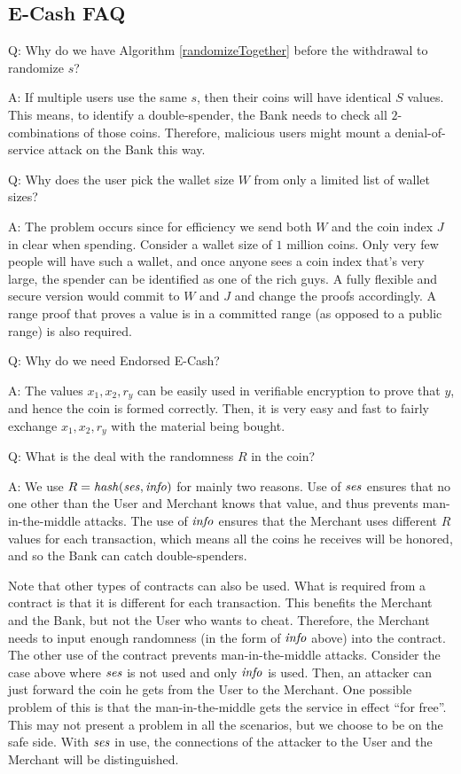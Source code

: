 \subsection{E-Cash FAQ}
Q: Why do we have Algorithm \ref{randomizeTogether} before the withdrawal to randomize $s$?

\noindent A: If multiple users use the same $s$, then their coins will have identical $S$ values. This means, to identify a double-spender, the Bank needs to check all $2$-combinations of those coins. Therefore, malicious users might mount a denial-of-service attack on the Bank this way.


Q: Why does the user pick the wallet size $W$ from only a limited list of wallet sizes?

\noindent A: The problem occurs since for efficiency we send both $W$ and the coin index $J$ in clear when spending. Consider a wallet size of $1$ million coins. Only very few people will have such a wallet, and once anyone sees a coin index that's very large, the spender can be identified as one of the rich guys. A fully flexible and secure version would commit to $W$ and $J$ and change the proofs accordingly. A range proof that proves a value is in a committed range (as opposed to a public range) is also required.


Q: Why do we need Endorsed E-Cash?

\noindent A: The values $x_1,x_2,r_y$ can be easily used in verifiable encryption to prove that $y$, and hence the coin is formed correctly. Then, it is very easy and fast to fairly exchange $x_1,x_2,r_y$ with the material being bought.


Q: What is the deal with the randomness $R$ in the coin?

\noindent A: We use $R = \mathit{hash}(\mathit{ses},\mathit{info})$ for mainly two reasons. Use of $\mathit{ses}$ ensures that no one other than the User and Merchant knows that value, and thus prevents man-in-the-middle attacks. The use of $\mathit{info}$ ensures that the Merchant uses different $R$ values for each transaction, which means all the coins he receives will be honored, and so the Bank can catch double-spenders.

Note that other types of contracts can also be used. What is required from a contract is that it is different for each transaction. This benefits the Merchant and the Bank, but not the User who wants to cheat. Therefore, the Merchant needs to input enough randomness (in the form of $\mathit{info}$ above) into the contract. The other use of the contract prevents man-in-the-middle attacks. Consider the case above where $\mathit{ses}$ is not used and only $\mathit{info}$ is used. Then, an attacker can just forward the coin he gets from the User to the Merchant. One possible problem of this is that the man-in-the-middle gets the service in effect ``for free''. This may not present a problem in all the scenarios, but we choose to be on the safe side. With $\mathit{ses}$ in use, the connections of the attacker to the User and the Merchant will be distinguished.


